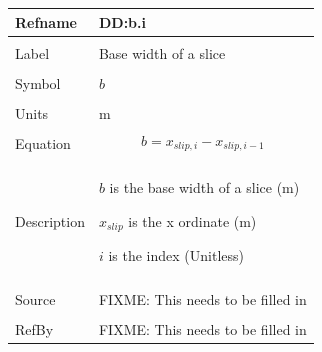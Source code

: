 \documentclass[12pt]{article}
\begin{document}
\noindent \begin{minipage}{\textwidth}
\begin{tabular}{p{} p{}}
\toprule \textbf{Refname} & \textbf{DD:b.i}
\label{DD:b.i}
\\ \midrule \\
Label & Base width of a slice
\\ \midrule \\
Symbol & $b$
\\ \midrule \\
Units & m
\\ \midrule \\
Equation & \begin{dmath}
           b={x_{slip,i}}-{x_{slip,i-1}}
           \end{dmath}
\\ \midrule \\
Description & \begin{symbDescription}
              \item{$b$ is the base width of a slice (m)}
              \item{${x_{slip}}$ is the x ordinate (m)}
              \item{$i$ is the index (Unitless)}
              \end{symbDescription}
\\ \midrule \\
Source & FIXME: This needs to be filled in
\\ \midrule \\
RefBy & FIXME: This needs to be filled in
\\ \bottomrule \end{tabular}
\end{minipage}\\
~\newline
\end{document}
